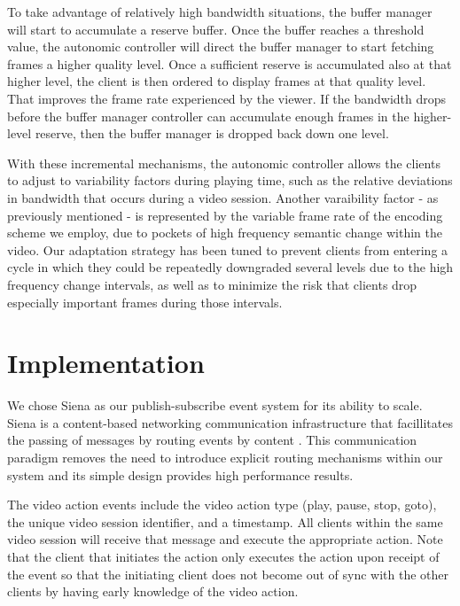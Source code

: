 \documentclass{sig-alternate}
\begin{document}
To take advantage of relatively high bandwidth situations, the buffer
manager will start to accumulate a reserve buffer.  Once the buffer
reaches a threshold value, the autonomic controller will direct the
buffer manager to start fetching frames a higher quality level.  Once
a sufficient reserve is accumulated also at that higher level, the
client is then ordered to display frames at that quality level.  That
improves the frame rate experienced by the viewer.  If the bandwidth
drops before the buffer manager controller can accumulate enough
frames in the higher-level reserve, then the buffer manager is dropped
back down one level.

With these incremental mechanisms, the autonomic controller allows the
clients to adjust to variability factors during playing time, such as
the relative deviations in bandwidth that occurs during a video
session.  Another varaibility factor - as previously mentioned - is
represented by the variable frame rate of the encoding scheme we
employ, due to pockets of high frequency semantic change within the
video.  Our adaptation strategy has been tuned to prevent clients from
entering a cycle in which they could be repeatedly downgraded several
levels due to the high frequency change intervals, as well as to
minimize the risk that clients drop especially important frames during
those intervals.

\section{Implementation} \label{implementation}

We chose Siena as our publish-subscribe event system for its ability
to scale.  Siena is a content-based networking communication
infrastructure that facillitates the passing of messages by routing
events by content \cite{SIENA}.  This communication paradigm removes
the need to introduce explicit routing mechanisms within our system
and its simple design provides high performance results.

The video action events include the video action type (play, pause,
stop, goto), the unique video session identifier, and a timestamp.
All clients within the same video session will receive that message
and execute the appropriate action.  Note that the client that
initiates the action only executes the action upon receipt of the
event so that the initiating client does not become out of sync with
the other clients by having early knowledge of the video action.
\end{document}
